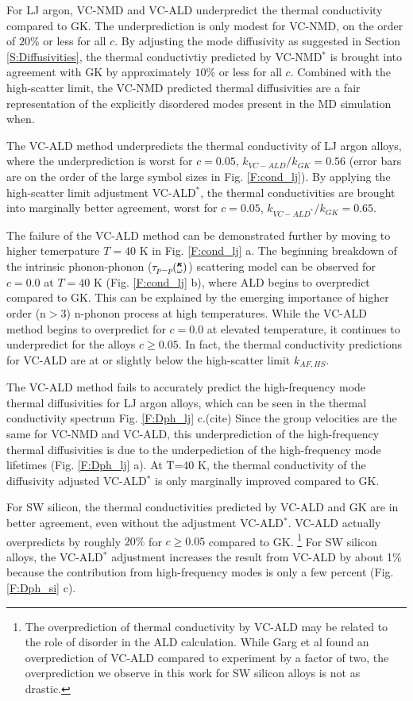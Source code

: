\documentclass[aps,prb,onecolumn,preprint,superscriptaddress,amsmath,amssymb,floatfix]{revtex4}
\newcommand{\kw}{\mspace{-4.0mu}\left(\mspace{-8.0mu}
\begin{smallmatrix}&\pmb{\kappa} \\&\omega\end{smallmatrix}
\mspace{-3.0mu}\right)}
\begin{document}
For LJ argon, VC-NMD and VC-ALD underpredict the thermal 
conductivity compared to GK. 
The underprediction is only modest for VC-NMD, on the order of 
$20\%$ or less for all $c$. By adjusting the mode diffusivity as 
suggested 
in Section \ref{S:Diffusivities}, 
the thermal conductivtiy predicted by VC-NMD$^*$ is 
brought 
into agreement with GK by approximately $10\%$ or less for all $c$. 
Combined with the high-scatter limit, the VC-NMD predicted thermal 
diffusivities are a fair representation of the explicitly 
disordered modes present in the MD simulation when.

The VC-ALD method underpredicts the thermal conductivity of LJ argon 
alloys, 
where 
the underprediction is worst for $c=0.05$, $k_{VC-ALD} / k_{GK} = 0.56$ 
(error bars are on the order 
of the large symbol sizes in Fig. \ref{F:cond_lj}). 
By applying the high-scatter limit 
adjustment VC-ALD$^*$, the thermal conductivities are brought into 
marginally 
better agreement, worst for $c=0.05$, $k_{VC-ALD^*} / k_{GK} = 0.65$. 

The failure of the VC-ALD method can be demonstrated further 
by moving to higher temerpature $T=40$ K in Fig. \ref{F:cond_lj} a.
The beginning breakdown of the intrinsic phonon-phonon ($\tau_{p-p}\kw$) 
scattering model 
can be observed for $c=0.0$ at 
$T=40$ K (Fig. \ref{F:cond_lj} b), 
where ALD begins to overpredict compared to GK. 
This 
can be explained by the emerging importance of higher order (n$> 3$) 
n-phonon process at high temperatures.\cite{turney_predicting_2009} 
While the VC-ALD method begins to overpredict for $c=0.0$ 
at elevated temperature, 
it continues to underpredict for the alloys $c \ge 0.05$.  In fact, the 
thermal conductivity predictions for VC-ALD are at or slightly below the  
high-scatter limit $k_{AF,HS}$. 

The VC-ALD method fails to 
accurately predict the high-frequency mode thermal diffusivities for 
LJ argon alloys, which can be seen in the thermal conductivity 
spectrum Fig. \ref{F:Dph_lj} c.(cite) 
Since the group velocities are the same for VC-NMD and VC-ALD, 
this underprediction of the high-frequency thermal diffusivities is 
due to the underpediction of the high-frequency 
mode lifetimes (Fig. \ref{F:Dph_lj} a). 
At T=40 K, the thermal conductivity of the diffusivity adjusted 
VC-ALD$^*$ is only marginally improved compared to GK. 

For SW silicon, the thermal conductivities predicted by VC-ALD and GK 
are in better agreement, even without the adjustment VC-ALD$^*$. VC-ALD 
actually overpredicts by roughly $20\%$ for $c \ge 0.05$ compared to GK.
\footnote[4]
{The overprediction of thermal conductivity by VC-ALD 
may be related to the role of disorder in the ALD calculation.
\cite{garg_role_2011,turney_predicting_2009} While Garg et al found 
an overprediction of VC-ALD compared to experiment by a factor of two, 
the overprediction 
we observe in this work for SW silicon alloys is not as drastic.}   
For SW silicon alloys, the VC-ALD$^*$ adjustment  
increases the result from VC-ALD by about 1$\%$ because the contribution 
from high-frequency modes is only a few percent (Fig. \ref{F:Dph_si} c). 
\end{document}
